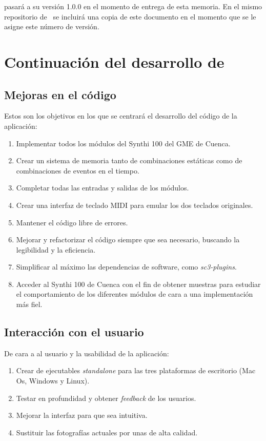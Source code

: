 \appName pasará a su versión 1.0.0 en el momento de entrega de esta memoria. En el mismo repositorio de \appName~se incluirá una copia de este documento en el momento que se le asigne este número de versión.


\section{Continuación del desarrollo de \appName}


\subsection{Mejoras en el código}
Estos son los objetivos en los que se centrará el desarrollo del código de la aplicación:

\begin{enumerate}
	\item Implementar todos los módulos del Synthi 100 del GME de Cuenca.
	\item Crear un sistema de memoria tanto de combinaciones estáticas como de combinaciones de eventos en el tiempo.
	\item Completar todas las entradas y salidas de los módulos.
	\item Crear una interfaz de teclado MIDI para emular los dos teclados originales.
	\item Mantener el código libre de errores.
	\item Mejorar y refactorizar el código siempre que sea necesario, buscando la legibilidad y la eficiencia.
	\item Simplificar al máximo las dependencias de software, como \textit{sc3-plugins}.
	\item Acceder al Synthi 100 de Cuenca con el fin de obtener muestras para estudiar el comportamiento de los diferentes módulos de cara a una implementación más fiel.
\end{enumerate}


\subsection{Interacción con el usuario}
De cara a al usuario y la usabilidad de la aplicación:

\begin{enumerate}
	\item Crear de ejecutables \textit{standalone} para las tres plataformas de escritorio (Mac Os, Windows y Linux).
	\item Testar en profundidad y obtener \textit{feedback} de los usuarios.
	\item Mejorar la interfaz para que sea intuitiva.
	\item Sustituir las fotografías actuales por unas de alta calidad.	
\end{enumerate}


